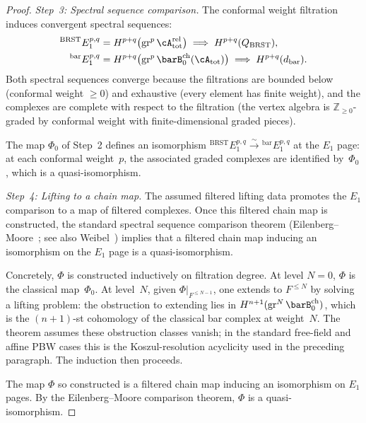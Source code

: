 \begin{proof}
\emph{Step~3: Spectral sequence comparison.}
The conformal weight filtration induces convergent spectral sequences:
\begin{align}
{}^{\mathrm{BRST}}E_1^{p,q}
 &= H^{p+q}\bigl(\mathrm{gr}^p\, \cA_{\mathrm{tot}}^{\mathrm{rel}}\bigr)
 \;\Longrightarrow\;
 H^{p+q}(Q_{\mathrm{BRST}}), \\
{}^{\mathrm{bar}}E_1^{p,q}
 &= H^{p+q}\bigl(\mathrm{gr}^p\, \barB^{\mathrm{ch}}_0(\cA_{\mathrm{tot}})\bigr)
 \;\Longrightarrow\;
 H^{p+q}(d_{\mathrm{bar}}).
\end{align}
Both spectral sequences converge because the filtrations are bounded
below (conformal weight $\geq 0$) and exhaustive (every element has
finite weight), and the complexes are complete with respect to the
filtration (the vertex algebra is $\mathbb{Z}_{\geq 0}$-graded by
conformal weight with finite-dimensional graded pieces).

The map $\Phi_0$ of Step~2 defines an isomorphism
${}^{\mathrm{BRST}}E_1^{p,q} \xrightarrow{\sim}
{}^{\mathrm{bar}}E_1^{p,q}$ at the $E_1$ page: at each conformal
weight~$p$, the associated graded complexes are identified by~$\Phi_0$,
which is a quasi-isomorphism.

\emph{Step~4: Lifting to a chain map.}
The assumed filtered lifting data promotes the $E_1$ comparison to a
map of filtered complexes. Once this filtered chain map is constructed,
the standard spectral sequence comparison theorem
(Eilenberg--Moore~\cite{EM66}; see also
Weibel~\cite[Theorem~5.2.12]{Weibel94}) implies that a filtered chain
map inducing an isomorphism on the $E_1$ page is a quasi-isomorphism.

Concretely, $\Phi$ is constructed inductively on filtration degree.
At level $N = 0$, $\Phi$ is the classical map~$\Phi_0$. At level~$N$,
given $\Phi|_{F^{\leq N-1}}$, one extends to $F^{\leq N}$ by solving
a lifting problem: the obstruction to extending lies in
$H^{n+1}(\mathrm{gr}^N\,\barB^{\mathrm{ch}}_0)$, which is the
$(n+1)$-st cohomology of the classical bar complex at weight~$N$.
The theorem assumes these obstruction classes vanish; in the standard
free-field and affine PBW cases this is the Koszul-resolution
acyclicity used in the preceding paragraph. The induction then proceeds.

The map $\Phi$ so constructed is a filtered chain map inducing an
isomorphism on $E_1$ pages. By the Eilenberg--Moore comparison
theorem, $\Phi$ is a quasi-isomorphism.
\end{proof}

